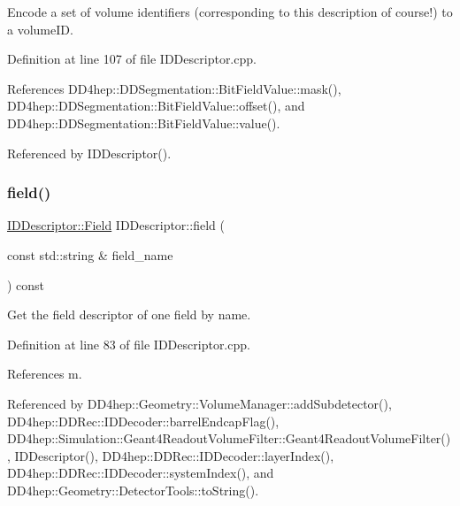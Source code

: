 Encode a set of volume identifiers (corresponding to this description of course!) to a volume\+ID. 



Definition at line 107 of file I\+D\+Descriptor.\+cpp.



References D\+D4hep\+::\+D\+D\+Segmentation\+::\+Bit\+Field\+Value\+::mask(), D\+D4hep\+::\+D\+D\+Segmentation\+::\+Bit\+Field\+Value\+::offset(), and D\+D4hep\+::\+D\+D\+Segmentation\+::\+Bit\+Field\+Value\+::value().



Referenced by I\+D\+Descriptor().

\hypertarget{class_d_d4hep_1_1_geometry_1_1_i_d_descriptor_a9179d503a536eab536eef71b20904116}{}\label{class_d_d4hep_1_1_geometry_1_1_i_d_descriptor_a9179d503a536eab536eef71b20904116} 
\subsubsection{\texorpdfstring{field()}{field()}\hspace{0.1cm}{\footnotesize\ttfamily [1/2]}}
{\footnotesize\ttfamily \hyperlink{class_d_d4hep_1_1_geometry_1_1_i_d_descriptor_ac06f5915e74f8a8f2ff73e9a322556e4}{I\+D\+Descriptor\+::\+Field} I\+D\+Descriptor\+::field (\begin{DoxyParamCaption}\item[{const std\+::string \&}]{field\+\_\+name }\end{DoxyParamCaption}) const}



Get the field descriptor of one field by name. 



Definition at line 83 of file I\+D\+Descriptor.\+cpp.



References m.



Referenced by D\+D4hep\+::\+Geometry\+::\+Volume\+Manager\+::add\+Subdetector(), D\+D4hep\+::\+D\+D\+Rec\+::\+I\+D\+Decoder\+::barrel\+Endcap\+Flag(), D\+D4hep\+::\+Simulation\+::\+Geant4\+Readout\+Volume\+Filter\+::\+Geant4\+Readout\+Volume\+Filter(), I\+D\+Descriptor(), D\+D4hep\+::\+D\+D\+Rec\+::\+I\+D\+Decoder\+::layer\+Index(), D\+D4hep\+::\+D\+D\+Rec\+::\+I\+D\+Decoder\+::system\+Index(), and D\+D4hep\+::\+Geometry\+::\+Detector\+Tools\+::to\+String().

